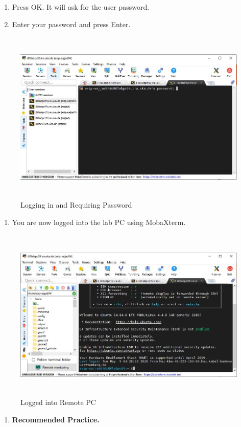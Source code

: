 \begin{enumerate}
	\def\labelenumi{\arabic{enumi}.}
	\setcounter{enumi}{4}
	\item
	Press OK. It will ask for the user password.
	\item
	Enter your password and press Enter.
\end{enumerate}
\begin{figure}
	\centering
	\includegraphics[width=5.67963in,height=3.28535in]{src/images/image16.JPG}
	\caption{Logging in and Requiring Password}
	\label{fig:fig16}
\end{figure}
\begin{enumerate}
	\def\labelenumi{\arabic{enumi}.}
	\setcounter{enumi}{6}
	\item
	You are now logged into the lab PC using MobaXterm.
\end{enumerate}
\begin{figure}
	\centering
	\includegraphics[width=5.70556in,height=3.27527in]{src/images/image17.JPG}
	\caption{Logged into Remote PC}
	\label{fig:fig17}
\end{figure}
\begin{enumerate}
	\def\labelenumi{\Alph{enumi}.}
	\setcounter{enumi}{8}
	\item
	\textbf{Recommended Practice.}
\end{enumerate}

